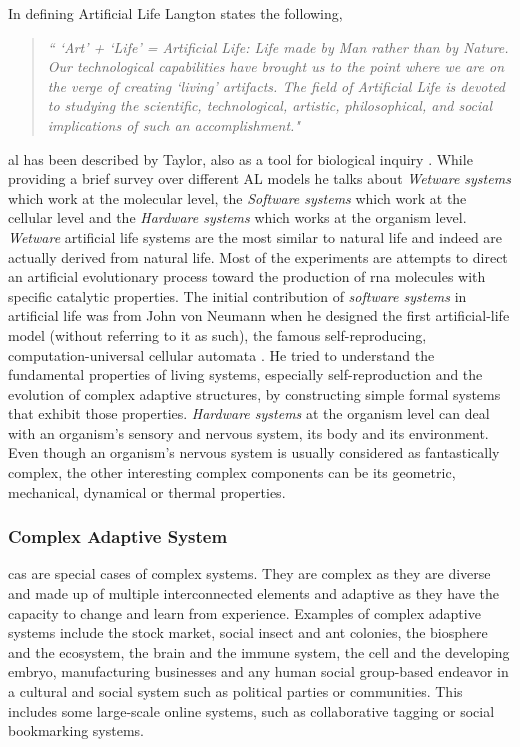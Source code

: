 \documentclass[letterpaper]{article}
\numberwithin{equation}{section}
\begin{document}
In defining Artificial Life Langton states the following,

\begin{quote}
\textsl{`` `Art' + `Life' = Artificial Life: Life made by Man rather than by Nature. Our technological capabilities have brought us to the point where we are on the verge of creating `living' artifacts. The field of Artificial Life is devoted to studying the scientific, technological, artistic, philosophical, and social implications of such an accomplishment."}
\end{quote}

\gls{al} has been described by Taylor, also as a tool for biological inquiry \cite{taylor1993}. While providing a brief survey over different AL models he talks about \textsl{Wetware systems} which work at the molecular level, the \textsl{Software systems} which work at the cellular level and the \textsl{Hardware systems} which works at the organism level. \textsl{Wetware} artificial life systems are the most similar to natural life and indeed are actually derived from natural life. Most of the experiments are attempts to direct an artificial evolutionary process toward the production of \gls{rna} molecules with specific catalytic properties. The initial contribution of \textsl{software systems} in artificial life was from John von Neumann when he designed the first artificial-life model (without referring to it as such), the famous self-reproducing, computation-universal cellular automata \cite{neumann1966}. He tried to understand the fundamental properties of living systems, especially self-reproduction and the evolution of complex adaptive structures, by constructing simple formal systems that exhibit those properties. \textsl{Hardware systems} at the organism level can deal with an organism's sensory and nervous system, its body and its environment. Even though an organism's nervous system is usually considered as fantastically complex, the other interesting complex components can be its geometric, mechanical, dynamical or thermal properties. 

\subsubsection{Complex Adaptive System}
\label{subsec:complex-adaptive-system}
\gls{cas} are special cases of complex systems. They are complex as they are diverse and made up of multiple interconnected elements and adaptive as they have the capacity to change and learn from experience. Examples of complex adaptive systems include the stock market, social insect and ant colonies, the biosphere and the ecosystem, the brain and the immune system, the cell and the developing embryo, manufacturing businesses and any human social group-based endeavor in a cultural and social system such as political parties or communities. This includes some large-scale online systems, such as collaborative tagging or social bookmarking systems.
\end{document}
